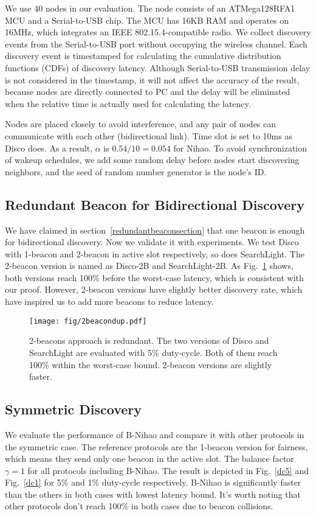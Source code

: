 \documentclass[conference]{IEEEtran}
\begin{document}
We use 40 nodes in our evaluation.
The node consists of an ATMega128RFA1 MCU and a Serial-to-USB chip.
The MCU has 16KB RAM and operates on 16MHz, which integrates an IEEE 802.15.4-compatible radio.
We collect discovery events from the Serial-to-USB port without occupying the wireless channel.
Each discovery event is timestamped for calculating the cumulative distribution functions (CDFs) of discovery latency.
Although Serial-to-USB transmission delay is not considered in the timestamp,
it will not affect the accuracy of the result,
because nodes are directly connected to PC and the delay will be eliminated when the relative time is actually used for calculating the latency.

Nodes are placed closely to avoid interference, and any pair of nodes can communicate with each other (bidirectional link).
Time slot is set to 10ms as Disco does. As a result, $\alpha$ is $0.54/10=0.054$ for Nihao.
To avoid synchronization of wakeup schedules, we add some random delay before nodes start discovering neighbors, and the seed of random number generator is the node's ID.

\subsection{Redundant Beacon for Bidirectional Discovery}\label{redundantbeaconexpsection}
We have claimed in section~\ref{redundantbeaconsection} that one beacon is enough for bidirectional discovery.
Now we validate it with experiments. 
We test Disco with 1-beacon and 2-beacon in active slot respectively, so does SearchLight.
The 2-beacon version is named as Disco-2B and SearchLight-2B.
As Fig.~\ref{2beacondup} shows, both versions reach 100\% before the worst-case latency, which is consistent with our proof.
However, 2-beacon versions have slightly better discovery rate, which have inspired us to add more beacons to reduce latency.

\begin{figure}[t]
    \centering
    \texttt{[image: fig/2beacondup.pdf]}
    \caption{2-beacons approach is redundant. The two versions of Disco and SearchLight are evaluated with 5\% duty-cycle.
             Both of them reach 100\% within the worst-case bound.
             2-beacon versions are slightly faster.}\label{2beacondup}
\end{figure}

\subsection{Symmetric Discovery}
We evaluate the performance of B-Nihao and compare it with other protocols in the symmetric case.
The reference protocols are the 1-beacon version for fairness, which means they send only one beacon in the active slot.
The balance factor $\gamma=1$ for all protocols including B-Nihao. 
The result is depicted in Fig.~\ref{dc5} and Fig.~\ref{dc1} for 5\% and 1\% duty-cycle respectively.
B-Nihao is significantly faster than the others in both cases with lowest latency bound.
It's worth noting that other protocols don't reach 100\% in both cases due to beacon collisions.
\end{document}
